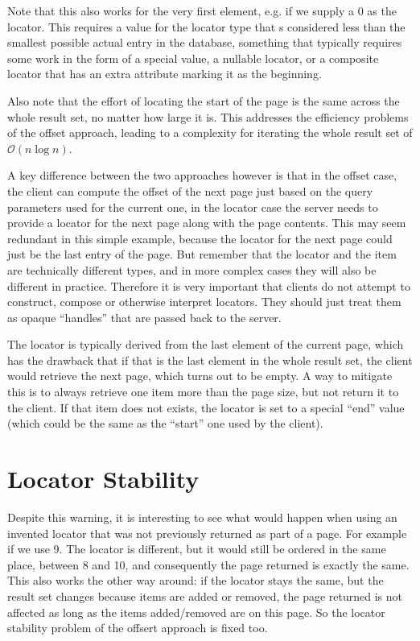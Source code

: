 \documentclass[11pt,a4paper]{article}
\begin{document}
\begin{multicols}{2}
Note that this also works for the very first element, e.g. if we supply a 0 as
the locator. This requires a value for the locator type that s considered less
than the smallest possible actual entry in the database, something that
typically requires some work in the form of a special value, a nullable locator,
or a composite locator that has an extra attribute marking it as the beginning.

Also note that the effort of locating the start of the page is the same across
the whole result set, no matter how large it is. This addresses the efficiency
problems of the offset approach, leading to a complexity for iterating the whole
result set of $\mathcal{O}(n\log{}n)$.

A key difference between the two approaches however is that in the offset case,
the client can compute the offset of the next page just based on the query
parameters used for the current one, in the locator case the server needs to
provide a locator for the next page along with the page contents. This may seem
redundant in this simple example, because the locator for the next page could
just be the last entry of the page. But remember that the locator and the item 
are technically different types, and in more complex cases they will also be
different in practice. Therefore it is very important that clients do not
attempt to construct, compose or otherwise interpret locators. They should just
treat them as opaque ``handles'' that are passed back to the server.

The locator is typically derived from the last element of the current page,
which has the drawback that if that is the last element in the whole result set,
the client would retrieve the next page, which turns out to be empty. A way to
mitigate this is to always retrieve one item more than the page size, but not
return it to the client. If that item does not exists, the locator is set to a
special ``end'' value (which could be the same as the ``start'' one used by the
client). 

\section*{Locator Stability}

Despite this warning, it is interesting to see what would happen when using an
invented locator that was not previously returned as part of a page. For example 
if we use 9. The locator is different, but it would still be ordered in the same
place, between 8 and 10, and consequently the page returned is exactly the same.
This also works the other way around: if the locator stays the same, but the
result set changes because items are added or removed, the page returned is not
affected as long as the items added/removed are on this page. So the locator
stability problem of the offsert approach is fixed too.


\end{multicols}
\end{document}
